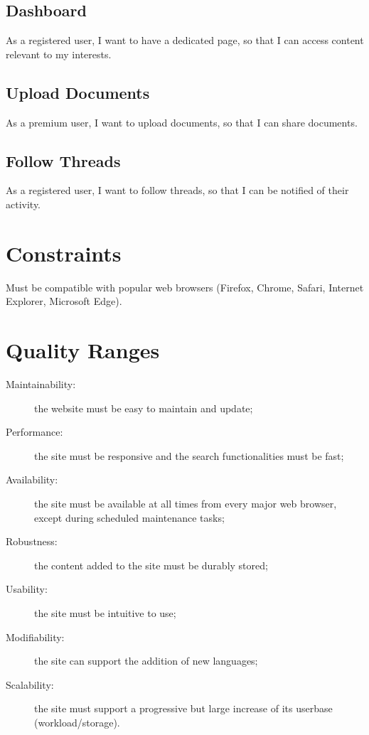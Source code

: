 \documentclass [a4paper, 11pt]{article}
\begin{document}
\subsection{Dashboard}
As a registered user, I want to have a dedicated page, so that I can access content relevant to my interests.

\subsection{Upload Documents}
As a premium user, I want to upload documents, so that I can share documents.

\subsection{Follow Threads}
As a registered user, I want to follow threads, so that I can be notified of their activity.



\section{Constraints}
Must be compatible with popular web browsers (Firefox, Chrome, Safari, Internet Explorer, Microsoft Edge).



\section{Quality Ranges}
\begin{description}
	\item [Maintainability:] the website must be easy to maintain and update;
	\item [Performance:] the site must be responsive and the search functionalities must be fast;
	\item [Availability:] the site must be available at all times from every major web browser, except during scheduled maintenance tasks;
	\item [Robustness:] the content added to the site must be durably stored;
	\item [Usability:] the site must be intuitive to use;
	\item [Modifiability:] the site can support the addition of new languages;
	\item [Scalability:] the site must support a progressive but large increase of its userbase (workload/storage).
\end{description}
\end{document}
